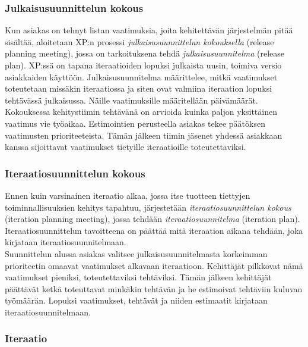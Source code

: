 \documentclass[finnish]{../tktltiki2}
\theoremstyle{definition}
\theoremstyle{remark}
\begin{document}
\subsubsection{Julkaisusuunnittelun kokous}

Kun asiakas on tehnyt listan vaatimuksia, joita kehitettävän järjestelmän pitää sisältää, aloitetaan XP:n prosessi \emph{julkaisusuunnittelun kokouksella} (release planning meeting),
jossa on tarkoituksena tehdä \emph{julkaisusuunnitelma} (release plan). XP:ssä on tapana iteraatioiden lopuksi julkaista uusin, toimiva versio asiakkaiden käyttöön. Julkaisusuunnitelma määrittelee, mitkä vaatimukset toteutetaan missäkin iteraatiossa ja siten ovat valmiina iteraation lopuksi tehtävässä julkaisussa. Näille vaatimuksille määritellään päivämäärät.\\

Kokouksessa kehitystiimin tehtävänä on arvioida kuinka paljon yksittäinen vaatimus vie työaikaa. Estimointien perusteella asiakas
tekee päätök\-sen vaatimusten prioriteeteista. Tämän jälkeen tiimin jäsenet
yhdessä asiakkaan kanssa sijoittavat vaatimukset tietyille iteraatioille toteutettaviksi.

\subsubsection{Iteraatiosuunnittelun kokous}

Ennen kuin varsinainen iteraatio alkaa, jossa itse tuotteen tiettyjen toiminnallisuuksien
kehitys tapahtuu, järjestetään \emph{iteraatiosuunnittelun kokous} (iteration planning meeting), jossa tehdään \emph{iteraatiosuunnitelma} (iteration plan). Iteraatiosuunnittelun tavoitteena on päättää mitä iteraation aikana tehdään, joka kirjataan iteraatiosuunnitelmaan.\\

Suunnittelun alussa asiakas valitsee julkaisusuunnitelmasta korkeimman prioriteetin omaavat vaatimukset alkavaan iteraatioon. Kehittäjät pilkkovat nämä vaatimukset pieniksi, toteutettaviksi tehtäviksi. Tämän jälkeen kehittäjät päättävät ketkä toteuttavat minkäkin tehtävän ja he estimoivat tehtäviin kuluvan työmäärän. Lopuksi vaatimukset, tehtävät ja niiden estimaatit kirjataan iteraatiosuunnitelmaan.

\subsubsection{Iteraatio}
\end{document}
